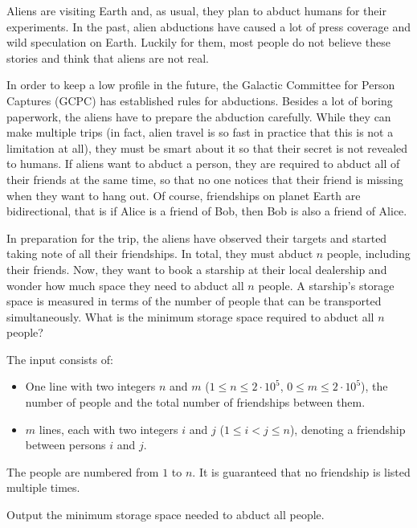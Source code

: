 \problemname{}
\newcommand{\maxn}{2 \cdot 10^5}


Aliens are visiting Earth and, as usual, they plan to abduct humans for their experiments.
In the past, alien abductions have caused a lot of press coverage and wild speculation on Earth.
Luckily for them, most people do not believe these stories and think that aliens are not real.

In order to keep a low profile in the future, the Galactic Committee for Person Captures (GCPC) has established rules for abductions.
Besides a lot of boring paperwork, the aliens have to prepare the abduction carefully.
While they can make multiple trips (in fact, alien travel is so fast in practice that this is not a limitation at all),
they must be smart about it so that their secret is not revealed to humans. If aliens want to abduct a person,
they are required to abduct all of their friends at the same time, so that no one notices that their friend is missing when they want to hang out.
Of course, friendships on planet Earth are bidirectional, that is if Alice is a friend of Bob, then Bob is also a friend of Alice.

In preparation for the trip, the aliens have observed their targets and started taking note of all their friendships.
In total, they must abduct $n$ people, including their friends.
Now, they want to book a starship at their local dealership and wonder how much space they need to abduct all $n$ people.
A starship's storage space is measured in terms of the number of people that can be transported simultaneously.
What is the minimum storage space required to abduct all $n$ people?

\begin{Input}
    The input consists of:
    \begin{itemize}
    \item One line with two integers $n$ and $m$ ($1\leq n\leq \maxn$, $0\leq m\leq \maxn$), the number of people and the total number of friendships between them.
    \item $m$ lines, each with two integers $i$ and $j$ ($1\leq i < j\leq n$), denoting a friendship between persons $i$ and $j$.
    \end{itemize}
    The people are numbered from $1$ to $n$. It is guaranteed that no friendship is listed multiple times.
\end{Input}

\begin{Output}
    Output the minimum storage space needed to abduct all people.
\end{Output}
